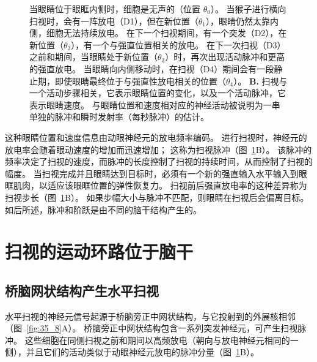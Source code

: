 \begin{figure}[htbp]
{		当眼睛位于眼眶内侧时，细胞是无声的（位置 $ \theta_0 $）。
		当猴子进行横向扫视时，会有一阵放电（D1），但在新位置（$ \theta_1 $），眼睛仍然太靠内侧，细胞无法持续放电。
		在下一个扫视期间，有一个突发（D2），在新位置（$ \theta_2 $），有一个与强直位置相关的放电。
		在下一次扫视（D3）之前和期间，当眼睛处于新位置（$ \theta_3 $）时，再次出现活动脉冲和更高的强直放电。
		当眼睛向内侧移动时，在扫视（D4）期间会有一段静止期，即使眼睛最终位于与强直性放电相关的位置（$ \theta_4 $）\cite{fuchs1970firing}。
		\textbf{B.} 扫视与一个活动步骤相关，它表示眼睛位置的变化，以及一个活动脉冲，它表示眼睛速度。
		与眼睛位置和速度相对应的神经活动被说明为一串单独的脉冲和瞬时发射率（每秒脉冲）的估计。}
	\label{fig:35_7}
\end{figure}


这种眼睛位置和速度信息由动眼神经元的放电频率编码。
进行扫视时，神经元的放电率会随着眼动速度的增加而迅速增加；
这称为扫视脉冲（图~\ref{fig:35_7}B）。
该脉冲的频率决定了扫视的速度，而脉冲的长度控制了扫视的持续时间，从而控制了扫视的幅度。
当扫视完成并且眼睛达到目标时，必须有一个新的强直输入水平输入到眼眶肌肉，以适应该眼眶位置的弹性恢复力。
扫视前后强直放电率的这种差异称为扫视步长（图~\ref{fig:35_7}B）。
如果步幅大小与脉冲不匹配，则眼睛在扫视后会偏离目标。
如后所述，脉冲和阶跃是由不同的脑干结构产生的。



\section{扫视的运动环路位于脑干}

\subsection{桥脑网状结构产生水平扫视}

水平扫视的神经元信号起源于桥脑旁正中网状结构，与它投射到的外展核相邻（图~\ref{fig:35_8}A）。
桥脑旁正中网状结构包含一系列突发神经元，可产生扫视脉冲。
这些细胞在同侧扫视之前和期间以高频放电（朝向与放电神经元相同的一侧），并且它们的活动类似于动眼神经元放电的脉冲分量（图~\ref{fig:35_7}B）。


